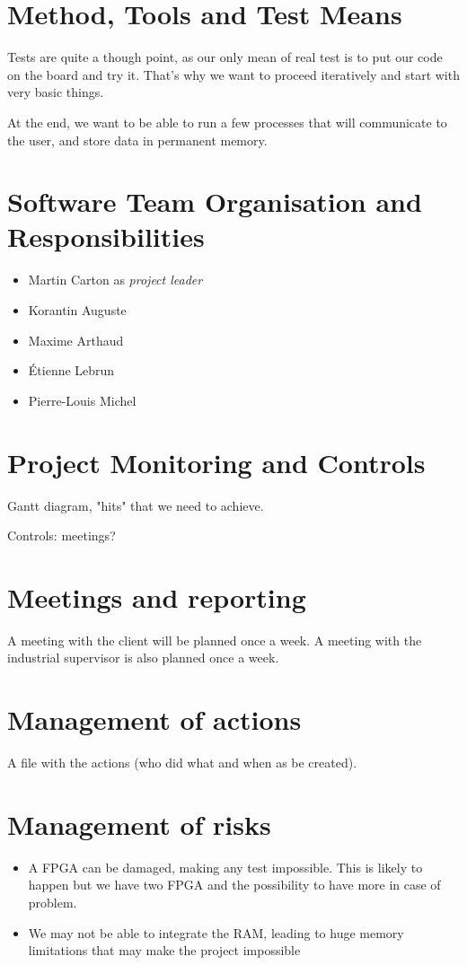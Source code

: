 \documentclass{article}
\begin{document}
  \section{Method, Tools and Test Means}
    Tests are quite a though point, as our only mean of real test is to put our
    code on the board and try it. That's why we want to proceed iteratively and
    start with very basic things.

    At the end, we want to be able to run a few processes that will communicate
    to the user, and store data in permanent memory.

  \section{Software Team Organisation and Responsibilities}
    \begin{itemize}
      \item Martin Carton as \textit{project leader}
      \item Korantin Auguste
      \item Maxime Arthaud
      \item Étienne Lebrun
      \item Pierre-Louis Michel
    \end{itemize}

  \section{Project Monitoring and Controls}
    

    Gantt diagram, "hits" that we need to achieve.

    Controls: meetings?

  \section{Meetings and reporting}
    A meeting with the client will be planned once a week. A meeting with the
    industrial supervisor is also planned once a week.

  \section{Management of actions}
    A file with the actions (who did what and when as be created).

  \section{Management of risks}
    \begin{itemize}
      \item A FPGA can be damaged, making any test impossible. This is likely to
          happen but we have two FPGA and the possibility to have more in case
          of problem.
      \item We may not be able to integrate the RAM, leading to huge memory
          limitations that may make the project impossible
    \end{itemize}
\end{document}
